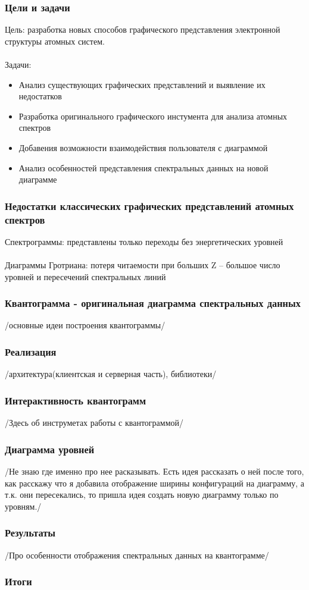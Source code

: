 \documentclass{beamer}
\begin{document}
\begin{frame}
\frametitle{Цели и задачи}
    Цель: разработка новых способов графического представления электронной структуры атомных систем.
     \\~\\
    Задачи:
    \begin{itemize}
        \item Анализ существующих графических представлений и выявление их недостатков
        \item Разработка оригинального графического инстумента для анализа атомных спектров
        \item Добавения возможности взаимодействия пользователя с диаграммой
        \item Анализ особенностей представления спектральных данных на новой диаграмме
    \end{itemize}
\end{frame}

\begin{frame}
\frametitle{Недостатки классических графических представлений атомных спектров}
    Спектрограммы: представлены только переходы без энергетических уровней
     \\~\\
    Диаграммы Гротриана: потеря читаемости при больших Z – большое число уровней и пересечений спектральных линий
\end{frame}

\begin{frame}
\frametitle{Квантограмма - оригинальная диаграмма спектральных данных}
    /основные идеи построения квантограммы/
\end{frame}

\begin{frame}
\frametitle{Реализация}
    /архитектура(клиентская и серверная часть), библиотеки/
\end{frame}

\begin{frame}
\frametitle{Интерактивность квантограмм}
    /Здесь об инструметах работы с квантограммой/
\end{frame}

\begin{frame}
\frametitle{Диаграмма уровней}
    /Не знаю где именно про нее расказывать. Есть идея рассказать о ней после того, как расскажу что я добавила отображение ширины конфигураций на диаграмму, а т.к. они пересекались, то пришла идея создать новую диаграмму только по уровням./
\end{frame}

\begin{frame}
\frametitle{Результаты }
    /Про особенности отображения спектральных данных на квантограмме/
\end{frame}

\begin{frame}
\frametitle{Итоги }
  
\end{frame}
\end{document}
